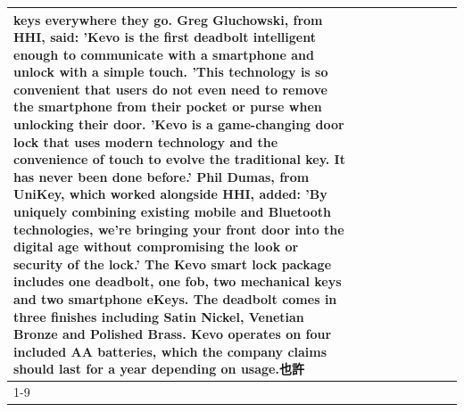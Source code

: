 \begin{table}[H]
\begin{tabular}{lllrlllll}
keys everywhere they go. Greg Gluchowski, from HHI, said: 'Kevo is the first deadbolt intelligent enough to communicate with a smartphone and unlock with a simple touch. 'This technology is so convenient that users do not even need to remove the smartphone from their pocket or purse when unlocking their door. 'Kevo is a game-changing door lock that uses modern technology and the convenience of touch to evolve the traditional key. It has never been done before.' Phil Dumas, from UniKey, which worked alongside HHI, added: 'By uniquely combining existing mobile and Bluetooth technologies, we’re bringing your front door into the digital age without compromising the look or security of the lock.' The Kevo smart lock package includes one deadbolt, one fob, two mechanical keys and two smartphone eKeys. The deadbolt comes in three finishes including Satin Nickel, Venetian Bronze and Polished Brass. Kevo operates on four included AA batteries, which the company claims should last for a year depending on usage.也許 \\
\cline{1-9}

\end{tabular}
\end{table}
